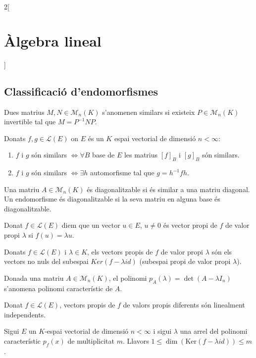 \documentclass[class=article,10pt,crop=false]{standalone}
\begin{document}
\begin{multicols}{2}[\section{Àlgebra lineal}]
\subsection{Classificació d'endomorfismes}
\begin{definition}
Dues matrius $M,N\in\mathcal{M}_n(K)$ s'anomenen similars si existeix $P\in\mathcal{M}_n(K)$ invertible tal que $M=P^{-1}NP$.
\end{definition}
\begin{prop}
Donats $f,g\in\mathcal{L}(E)$ on $E$ és un $K$ espai vectorial de dimensió $n<\infty$:
\begin{enumerate}
    \item $f$ i $g$ són similars $\iff\forall B$ base de $E$ les matrius $[f]_B$ i $[g]_B$ són similars.
    \item $f$ i $g$ són similars $\iff\exists h$ automorfisme tal que $g=h^{-1}fh$.
\end{enumerate}
\end{prop}
\begin{definition}
Una matriu $A\in\mathcal{M}_n(K)$ és diagonalitzable si és similar a una matriu diagonal. Un endomorfisme és diagonalitzable si la seva matriu en alguna base és diagonalitzable.
\end{definition}
\begin{definition}
Donat $f\in\mathcal{L}(E)$ diem que un vector $u\in E$, $u\ne 0$ és vector propi de $f$ de valor propi $\lambda$ si $f(u)=\lambda u$.
\end{definition}
\begin{lemma}
Donats $f\in\mathcal{L}(E)$ i $\lambda\in K$, els vectors propis de $f$ de valor propi $\lambda$ són els vectors no nuls del subespai $Ker(f-\lambda id)$ (subespai propi de valor propi $\lambda$).
\end{lemma}
\begin{definition}
Donada una matriu $A\in\mathcal{M}_n(K)$, el polinomi $p_A(\lambda)=\det(A-\lambda I_n)$ s'anomena polinomi característic de $A$.
\end{definition}
\begin{prop}
Donat $f\in\mathcal{L}(E)$, vectors propis de $f$ de valors propis diferents són linealment independents.
\end{prop}
\begin{prop}
Sigui $E$ un $K$-espai vectorial de dimensió $n<\infty$ i sigui $\lambda$ una arrel del polinomi característic $p_f(x)$ de multiplicitat $m$. Llavors $1\leq \dim(\text{Ker}(f-\lambda id))\leq m$.
\end{prop}

\end{multicols}
\end{document}
